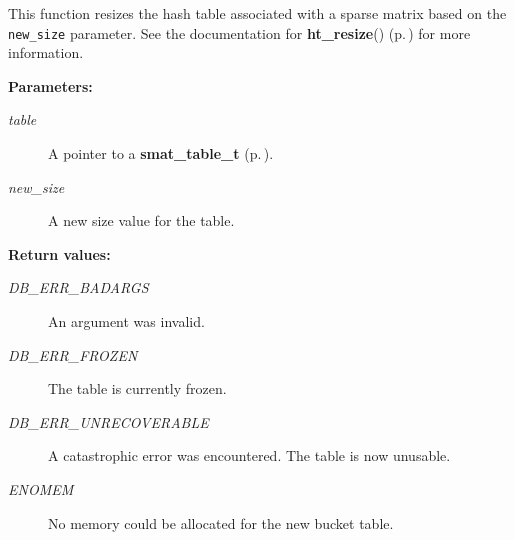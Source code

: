  This function resizes the hash table associated with a sparse matrix based on the {\tt new\_\-size} parameter. See the documentation for {\bf ht\_\-resize}() {\rm (p.\,\pageref{group__dbprim__hash_a13})} for more information.\begin{Desc}
\item[{\bf Parameters: }]\par
\begin{description}
\item[
{\em table}]A pointer to a {\bf smat\_\-table\_\-t} {\rm (p.\,\pageref{group__dbprim__smat_a0})}. \item[
{\em new\_\-size}]A new size value for the table.\end{description}
\end{Desc}
\begin{Desc}
\item[{\bf Return values: }]\par
\begin{description}
\item[
{\em DB\_\-ERR\_\-BADARGS}]An argument was invalid. \item[
{\em DB\_\-ERR\_\-FROZEN}]The table is currently frozen. \item[
{\em DB\_\-ERR\_\-UNRECOVERABLE}]A catastrophic error was encountered. The table is now unusable. \item[
{\em ENOMEM}]No memory could be allocated for the new bucket table. \end{description}
\end{Desc}
